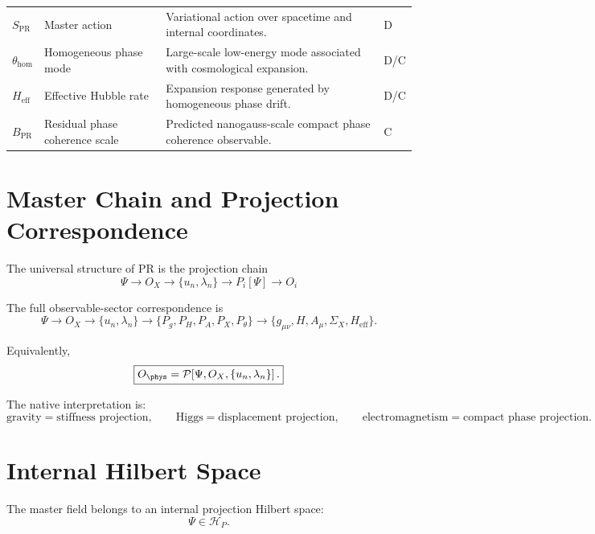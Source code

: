 \documentclass[11pt]{article}
\newcommand{\PR}{\mathrm{PR}}
\newcommand{\eff}{\mathrm{eff}}
\newcommand{\hom}{\mathrm{hom}}
\begin{document}
\begin{longtable}{>{\raggedright\arraybackslash}p{}
>{\raggedright\arraybackslash}p{}
>{\raggedright\arraybackslash}p{}
>{\centering\arraybackslash}p{}}
$S_{\PR}$ & Master action & Variational action over spacetime and internal coordinates. & D \\

$\theta_{\hom}$ & Homogeneous phase mode & Large-scale low-energy mode associated with cosmological expansion. & D/C \\

$H_{\eff}$ & Effective Hubble rate & Expansion response generated by homogeneous phase drift. & D/C \\

$B_{\PR}$ & Residual phase coherence scale & Predicted nanogauss-scale compact phase coherence observable. & C \\

\bottomrule
\end{longtable}


\section{Master Chain and Projection Correspondence}

The universal structure of PR is the projection chain
\begin{equation}
\boxed{
\Psi
\longrightarrow
O_X
\longrightarrow
\{u_n,\lambda_n\}
\longrightarrow
P_i[\Psi]
\longrightarrow
O_i
}
\end{equation}

The full observable-sector correspondence is
\begin{equation}
\boxed{
\Psi
\rightarrow
O_X
\rightarrow
\{u_n,\lambda_n\}
\rightarrow
\{P_g,P_H,P_A,P_X,P_\theta\}
\rightarrow
\{g_{\mu\nu},H,A_\mu,\Sigma_X,H_{\eff}\}.
}
\end{equation}

Equivalently,
\begin{equation}
\boxed{
O_{\phys}
=
\mathcal P\!\left[
\Psi,O_X,\{u_n,\lambda_n\}
\right].
}
\end{equation}

The native interpretation is:
\[
\text{gravity}=\text{stiffness projection},\qquad
\text{Higgs}=\text{displacement projection},\qquad
\text{electromagnetism}=\text{compact phase projection}.
\]


\section{Internal Hilbert Space}

The master field belongs to an internal projection Hilbert space:
\begin{equation}
\Psi\in\mathcal H_P.
\end{equation}
\end{document}
